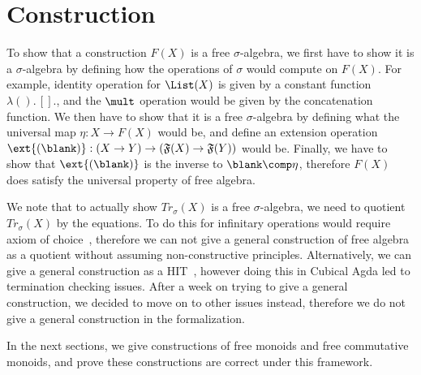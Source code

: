 \section{Construction}\label{algebra:tree}
To show that a construction $F(X)$ is a free $\sigma$-algebra, we first have to
show it is a $\sigma$-algebra by defining how the operations of $\sigma$
would compute on $F(X)$. For example, identity operation for $\List(X)$
is given by a constant function $\lambda().\,[].$, and the $\mult$ operation
would be given by the concatenation function. We then have to show that
it is a free $\sigma$-algebra by defining what the universal map
$\eta : X \to F(X)$ would be, and define an extension operation
$\ext{(\blank)} : (X \to Y) \to (\mathfrak{F}(X) \to \mathfrak{F}(Y))$
would be. Finally, we have to show that $\ext{(\blank)}$ is the inverse
to $\blank \comp \eta$, therefore $F(X)$ does satisfy the universal property
of free algebra.

We note that to actually show $Tr_\sigma(X)$ is a free $\sigma$-algebra,
we need to quotient $Tr_\sigma(X)$ by the equations. To do this for
infinitary operations would require axiom of choice~\cite{blassWordsFreeAlgebras1983},
therefore we can not give a general construction of free algebra as a quotient
without assuming non-constructive principles. Alternatively, we can give
a general construction as a HIT~\cite{univalentfoundationsprogramHomotopyTypeTheory2013},
however doing this in Cubical Agda led to termination checking issues.
After a week on trying to give a general construction, we decided to
move on to other issues instead, therefore we do not give a general
construction in the formalization.

In the next sections, we give constructions of 
free monoids and free commutative monoids, and prove these constructions
are correct under this framework.